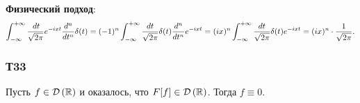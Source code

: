 \textbf{Физический подход}:
\begin{equation*}
    \int_{-\infty}^{+\infty} \frac{\, d t}{\sqrt{2\pi}} e^{-ixt} \frac{d^n}{d t^n} \delta(t) = 
    (-1)^n \int_{-\infty}^{+\infty} \frac{d t}{\sqrt{2\pi}} \delta(t) \frac{d^n }{d t^n} e^{- i x t} = 
    (i x)^n \int_{-\infty}^{+\infty} \frac{d t}{\sqrt{2\pi}}  \delta(t) e^{-ixt} = (ix)^n \cdot \frac{1}{\sqrt{2\pi}}.
\end{equation*}




\subsubsection*{Т33}

\begin{to_thr}[]
    Пусть $f \in \mathcal D\left(\mathbb{R}\right)$ и оказалось, что $F[f] \in \mathcal D\left(\mathbb{R}\right)$. Тогда $f \equiv 0$.
\end{to_thr}





